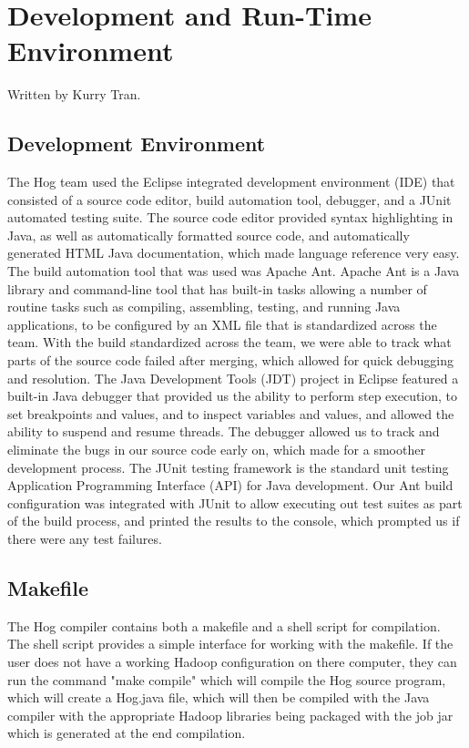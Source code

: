 \documentclass{report}
\begin{document}
\chapter{Development and Run-Time Environment}
\label{chap:environ}

Written by Kurry Tran.


\section{Development Environment} The Hog team used the Eclipse integrated development environment (IDE) that consisted of a
source code editor, build automation tool, debugger, and a JUnit automated testing suite. The source code editor provided
syntax highlighting in Java, as well as automatically formatted source code, and automatically generated HTML Java
documentation, which made language reference very easy. The build automation tool that was used was Apache Ant. Apache Ant is
a Java library and command-line tool that has built-in tasks allowing a number of routine tasks such as compiling, assembling,
testing, and running Java applications, to be configured by an XML file that is standardized across the team. With the build
standardized across the team, we were able to track what parts of the source code failed after merging, which allowed for
quick debugging and resolution. The Java Development Tools (JDT) project in Eclipse featured a built-in Java debugger that
provided us the ability to perform step execution, to set breakpoints and values, and to inspect variables and values, and
allowed the ability to suspend and resume threads. The debugger allowed us to track and eliminate the bugs in our source code
early on, which made for a smoother development process. The JUnit testing framework is the standard unit testing Application
Programming Interface (API) for Java development. Our Ant build configuration was integrated with JUnit to allow executing out
test suites as part of the build process, and printed the results to the console, which prompted us if there were any test
failures.

\section{Makefile}
The Hog compiler contains both a makefile and a shell script for compilation. 
The shell script provides a simple interface for working with the makefile. If the user
does not have a working Hadoop configuration on there computer, they can run the
command "make compile" which will compile the Hog source program, which will 
create a Hog.java file, which will then be compiled with the Java compiler with the appropriate
Hadoop libraries being packaged with the job jar which is generated at the end compilation.
\end{document}
